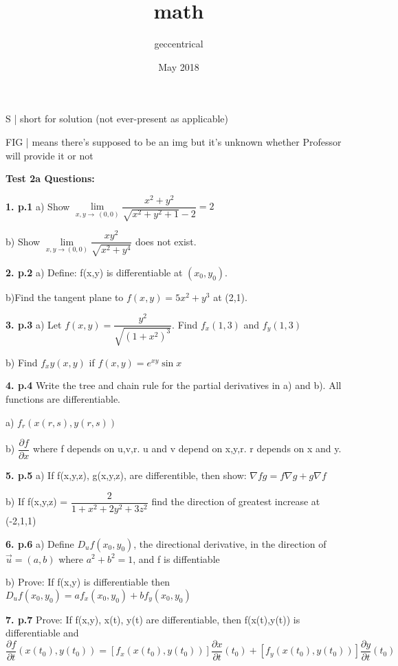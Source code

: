 \documentclass{article}
\title{math}
\author{geccentrical }
\date{May 2018}
\begin{document}
S | short for solution (not ever-present as applicable)

FIG | means there's supposed to be an img but it's unknown whether Professor will provide it or not


\vspace{5mm}
{\Large \textbf{Test 2a Questions:}}

\vspace{5mm}
\textbf{1. p.1} a) Show $\lim \limits_{x,y\to\ (0,0)} \dfrac{x^2+y^2}{\sqrt{x^2+y^2+1}-2}=2$

b) Show $\lim \limits_{x,y\to (0,0)} \dfrac{xy^2}{\sqrt{x^2+y^4}}$ does not exist.

\vspace{5mm}
\textbf{2. p.2} a) Define: f(x,y) is differentiable at \((x_0,y_0)\).

b)Find the tangent plane to $f(x,y) = 5x^2+y^3$ at (2,1).

\vspace{5mm}
\textbf{3. p.3} a) Let $f(x,y) = \dfrac{y^2}{\sqrt{(1+x^2)^3}}$. Find $f_x(1,3)$ and $f_y(1,3)$

b) Find $f_xy(x,y)$ if $f(x,y) = e^{xy}\sin{x}$

\vspace{5mm}
\textbf{4. p.4} Write the tree and chain rule for the partial derivatives in a) and b). All functions are differentiable.

a) $f_r(x(r,s),y(r,s))$

b) $\dfrac{\partial f}{\partial x}$ where f depends on u,v,r. u and v depend on x,y,r. r depends on x and y.

\vspace{5mm}
\textbf{5. p.5} a) If f(x,y,z), g(x,y,z), are differentible, then show: $\nabla fg = f\nabla g + g \nabla f$

b) If f(x,y,z) = $\dfrac{2}{1+x^2+2y^2+3z^2}$ find the direction of greatest increase at (-2,1,1)

\vspace{5mm}
\textbf{6. p.6} a) Define $D_uf(x_0,y_0)$, the directional derivative, in the direction of $\Vec{u} = (a,b)$ where \(a^2+b^2=1\), and f is diffentiable

b) Prove: If f(x,y) is differentiable then $D_uf(x_0,y_0) = af_x(x_0,y_0) + bf_y(x_0,y_0)$ 

\vspace{5mm}
\textbf{7. p.7} Prove: If f(x,y), x(t), y(t) are differentiable, then f(x(t),y(t)) is differentiable and $$\dfrac{\partial f}{\partial t}(x(t_0),y(t_0)) = [f_x(x(t_0),y(t_0))]\dfrac{\partial x}{\partial t}(t_0)+[f_y(x(t_0),y(t_0))]\dfrac{\partial y}{\partial t}(t_0)$$
\end{document}

